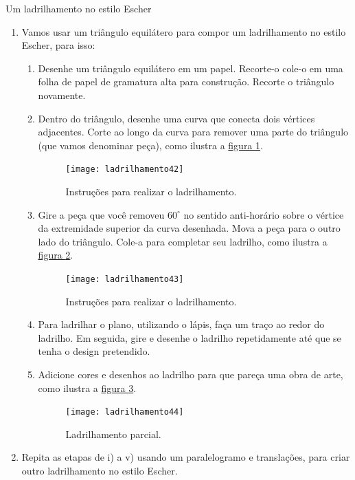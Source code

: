 \begin{task}{Um ladrilhamento no estilo Escher}\label{at_outros3}
\begin{enumerate}
\item Vamos usar um triângulo equilátero para compor um ladrilhamento no estilo Escher, para isso:  
\begin{enumerate}

	\item Desenhe um triângulo equilátero em um papel. Recorte-o  cole-o em uma folha de papel de gramatura alta para construção. Recorte o triângulo novamente.

	\item Dentro do triângulo, desenhe uma curva que conecta dois vértices adjacentes. Corte ao longo da curva para remover uma parte do triângulo (que vamos denominar peça), como ilustra a \hyperref[escher1]{figura \ref{escher1}}.

	\begin{figure}[H]
	\centering
	\texttt{[image: ladrilhamento42]}
	\caption{Instruções para realizar o ladrilhamento.}
	\label{escher1}
	\end{figure}

	\item Gire a peça que você removeu $60^{\circ}$ no sentido anti-horário sobre o vértice da extremidade superior da curva desenhada. Mova a peça para o outro lado do triângulo. Cole-a para completar seu ladrilho, como ilustra a \hyperref[escher2]{figura \ref{escher2}}.

	\begin{figure}[H]
	\centering
	\texttt{[image: ladrilhamento43]}
	\caption{Instruções para realizar o ladrilhamento.}
	\label{escher2}
	\end{figure}

	\item Para ladrilhar o plano, utilizando o lápis, faça um traço ao redor do ladrilho. Em seguida, gire e desenhe o ladrilho repetidamente até que se tenha o design pretendido.
	\item Adicione cores e desenhos ao ladrilho para que pareça uma obra de arte, como ilustra a \hyperref[escher3]{figura \ref{escher3}}.

	\begin{figure}[H]
	\centering
	\texttt{[image: ladrilhamento44]}
	\caption{Ladrilhamento parcial.}
	\label{escher3}
	\end{figure}
\end{enumerate}

	\item Repita as etapas de i) a v) usando um paralelogramo e translações, para criar outro ladrilhamento no estilo Escher.

\end{enumerate}
\end{task}



